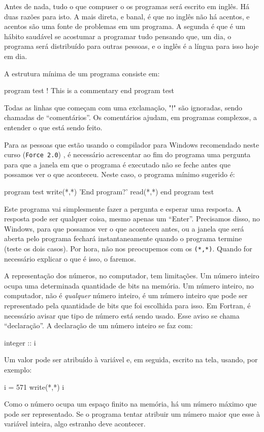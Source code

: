 \documentclass[10pt,a4paper,ssfamily]{exam}
\begin{document}
Antes de nada, tudo o que compuser o os programas será escrito em
inglês. Há duas razões para isto. A mais direta, e banal, é que no
inglês não há acentos, e acentos são uma fonte de problemas em um
programa. A segunda é que é um hábito saudável se acostumar a programar
tudo pensando que, um dia, o programa será distribuído para outras
pessoas, e o inglês é a língua para isso hoje em dia.

A estrutura mínima de um programa consiste em:
\begin{code}
program test
  ! This is a commentary
end program test
\end{code}
Todas as linhas que começam com uma exclamação, "!" são ignoradas, sendo
chamadas de ``comentários''. Os comentários ajudam, em programas
complexos, a entender o que está sendo feito.

Para as pessoas que estão usando o compilador para Windows recomendado
neste curso ({\tt Force 2.0}) , é necessário acrescentar ao fim do
programa uma pergunta para que a janela em que o programa é executado
não se feche antes que possamos ver o que aconteceu. Neste caso, o
programa mínimo sugerido é: 
\begin{code}
program test
  write(*,*) 'End program?'
  read(*,*) 
end program test
\end{code}
Este programa vai simplesmente fazer a pergunta e esperar uma resposta.
A resposta pode ser qualquer coisa, mesmo apenas um ``Enter''.
Precisamos disso, no Windows, para que possamos ver o que aconteceu
antes, ou a janela que será aberta pelo programa fechará
instantaneamente quando o programa termine (teste os dois casos). Por
hora, não nos preocupemos com os {\tt (*,*)}. Quando for necessário
explicar o que é isso, o faremos.

A representação dos números, no computador, tem limitações. Um número
inteiro ocupa uma determinada quantidade de bits na memória. Um número
inteiro, no computador, não é {\it qualquer} número inteiro, é um número
inteiro que pode ser representado pela quantidade de bits que foi
escolhida para isso. Em Fortran, é necessário avisar que tipo de número
está sendo usado. Esse aviso se chama ``declaração''. A declaração de um
número inteiro se faz com:
\begin{code}
integer :: i
\end{code}  
Um valor pode ser atribuído à variável e, em seguida, escrito na tela,
usando, por exemplo:
\begin{code}
i = 571
write(*,*) i
\end{code}
Como o número ocupa um espaço finito na memória, há um número máximo que
pode ser representado. Se o programa tentar atribuir um número maior que
esse à variável inteira, algo estranho deve acontecer.
\end{document}
